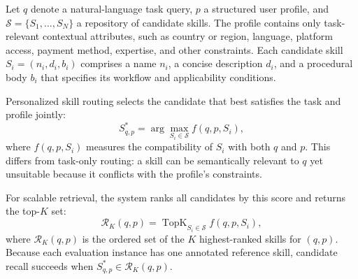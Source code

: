 \documentclass[letterpaper]{article} %
\begin{document}


% 





Let $q$ denote a natural-language task query, $p$ a structured user profile, and $\mathcal{S}=\{S_1,\ldots,S_N\}$ a repository of candidate skills. The profile contains only task-relevant contextual attributes, such as country or region, language, platform access, payment method, expertise, and other constraints. Each candidate skill $S_i=(n_i,d_i,b_i)$ comprises a name $n_i$, a concise description $d_i$, and a procedural body $b_i$ that specifies its workflow and applicability conditions.

Personalized skill routing selects the candidate that best satisfies the task and profile jointly:
\begin{equation}
S_{q,p}^{*}
=
\arg\max_{S_i\in\mathcal{S}}
f(q,p,S_i),
\label{eq:personalized_skill_routing}
\end{equation}
where $f(q,p,S_i)$ measures the compatibility of $S_i$ with both $q$ and $p$. This differs from task-only routing: a skill can be semantically relevant to $q$ yet unsuitable because it conflicts with the profile's constraints.

For scalable retrieval, the system ranks all candidates by this score and returns the top-$K$ set:
\begin{equation}
\mathcal{R}_K(q,p)
=
\operatorname{TopK}_{S_i\in\mathcal{S}}
f(q,p,S_i),
\label{eq:personalized_topk_routing}
\end{equation}
where $\mathcal{R}_K(q,p)$ is the ordered set of the $K$ highest-ranked skills for $(q,p)$. Because each evaluation instance has one annotated reference skill, candidate recall succeeds when $S^*_{q,p}\in\mathcal{R}_K(q,p)$.
\end{document}
